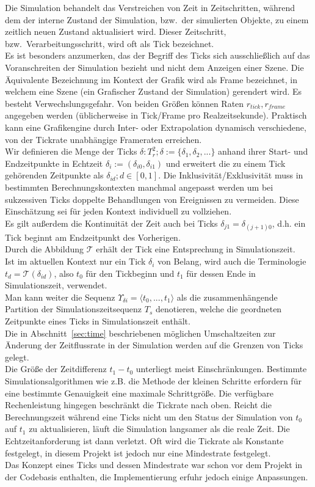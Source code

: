 
Die Simulation behandelt das Verstreichen von Zeit in Zeitschritten, während dem der interne Zustand der Simulation, bzw.~der simulierten Objekte, zu einem zeitlich neuen Zustand aktualisiert wird.
Dieser Zeitschritt, bzw.~Verarbeitungsschritt, wird oft als Tick bezeichnet.\\

Es ist besonders anzumerken, das der Begriff des Ticks sich ausschließlich auf das Voranschreiten der Simulation bezieht und nicht dem Anzeigen einer Szene. Die Äquivalente Bezeichnung im Kontext der Grafik wird als Frame bezeichnet, in welchem eine Szene (ein Grafischer Zustand der Simulation) gerendert wird. Es besteht Verwechslungsgefahr. Von beiden Größen können Raten $r_{tick}, r_{frame}$ angegeben werden (üblicherweise in Tick/Frame pro Realzeitsekunde). Praktisch kann eine Grafikengine durch Inter- oder Extrapolation dynamisch verschiedene, von der Tickrate unabhängige Frameraten erreichen.\\
Wir definieren die Menge der Ticks $\delta:T_r^2; \delta:=\{\delta_1, \delta_2, ...\}$ anhand ihrer Start- und Endzeitpunkte in Echtzeit $\delta_i := (\delta_{i0}, \delta_{i1})$ und erweitert die zu einem Tick gehörenden Zeitpunkte als $\delta_{id}; d \in [0,1]$. Die Inklusivität/Exklusivität muss in bestimmten Berechnungskontexten manchmal angepasst werden um bei sukzessiven Ticks doppelte Behandlungen von Ereignissen zu vermeiden. Diese Einschätzung sei für jeden Kontext individuell zu vollziehen.\\
Es gilt außerdem die Kontinuität der Zeit auch bei Ticks $\delta_{j1} = \delta_{(j+1)0}$, d.h. ein Tick beginnt am Endzeitpunkt des Vorherigen.\\
Durch die Abbildung $\mathcal{T}$ erhält der Tick eine Entsprechung in Simulationszeit.\\
Ist im aktuellen Kontext nur ein Tick $\delta_i$ von Belang, wird auch die Terminologie $t_d =\mathcal{T}(\delta_{id})$, also $t_0$ für den Tickbeginn und $t_1$ für dessen Ende in Simulationszeit, verwendet.\\
Man kann weiter die Sequenz $\Upsilon_{\delta i} = \langle t_0, ...,  t_1\rangle$ als die zusammenhängende Partition der Simulationszeitsequenz $T_s$ denotieren, welche die geordneten Zeitpunkte eines Ticks in Simulationszeit enthält.\\
Die in Abschnitt~\ref{sec:time} beschriebenen möglichen Umschaltzeiten zur Änderung der Zeitflussrate in der Simulation werden auf die Grenzen von Ticks gelegt.\\
Die Größe der Zeitdifferenz $t_1 - t_0$ unterliegt meist Einschränkungen. Bestimmte Simulationsalgorithmen wie z.B. die Methode der kleinen Schritte erfordern für eine bestimmte Genauigkeit eine maximale Schrittgröße. Die verfügbare Rechenleistung hingegen beschränkt die Tickrate nach oben. Reicht die Berechnungszeit während eine Ticks nicht um den Status der Simulation von $t_0$ auf $t_1$ zu aktualisieren, läuft die Simulation langsamer als die reale Zeit. Die Echtzeitanforderung ist dann verletzt. Oft wird die Tickrate als Konstante festgelegt, in diesem Projekt ist jedoch nur eine Mindestrate festgelegt.\\
Das Konzept eines Ticks und dessen Mindestrate war schon vor dem Projekt in der Codebasis enthalten, die Implementierung erfuhr jedoch einige Anpassungen.
